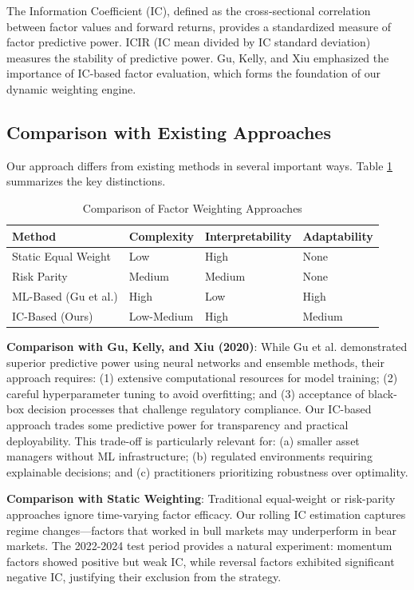 \documentclass[12pt]{article}
\begin{document}
The Information Coefficient (IC), defined as the cross-sectional correlation between factor values and forward returns, provides a standardized measure of factor predictive power. ICIR (IC mean divided by IC standard deviation) measures the stability of predictive power. Gu, Kelly, and Xiu \citep{gu2020} emphasized the importance of IC-based factor evaluation, which forms the foundation of our dynamic weighting engine.

\subsection{Comparison with Existing Approaches}

Our approach differs from existing methods in several important ways. Table \ref{tab:comparison} summarizes the key distinctions.

\begin{table}[h]
\centering
\caption{Comparison of Factor Weighting Approaches}
\label{tab:comparison}
\begin{tabular}{llll}
\toprule
\textbf{Method} & \textbf{Complexity} & \textbf{Interpretability} & \textbf{Adaptability} \\
\midrule
Static Equal Weight & Low & High & None \\
Risk Parity & Medium & Medium & None \\
ML-Based (Gu et al.) & High & Low & High \\
IC-Based (Ours) & Low-Medium & High & Medium \\
\bottomrule
\end{tabular}
\end{table}

\textbf{Comparison with Gu, Kelly, and Xiu (2020)}: While Gu et al. demonstrated superior predictive power using neural networks and ensemble methods, their approach requires: (1) extensive computational resources for model training; (2) careful hyperparameter tuning to avoid overfitting; and (3) acceptance of black-box decision processes that challenge regulatory compliance. Our IC-based approach trades some predictive power for transparency and practical deployability. This trade-off is particularly relevant for: (a) smaller asset managers without ML infrastructure; (b) regulated environments requiring explainable decisions; and (c) practitioners prioritizing robustness over optimality.

\textbf{Comparison with Static Weighting}: Traditional equal-weight or risk-parity approaches ignore time-varying factor efficacy. Our rolling IC estimation captures regime changes---factors that worked in bull markets may underperform in bear markets. The 2022-2024 test period provides a natural experiment: momentum factors showed positive but weak IC, while reversal factors exhibited significant negative IC, justifying their exclusion from the strategy.
\end{document}
